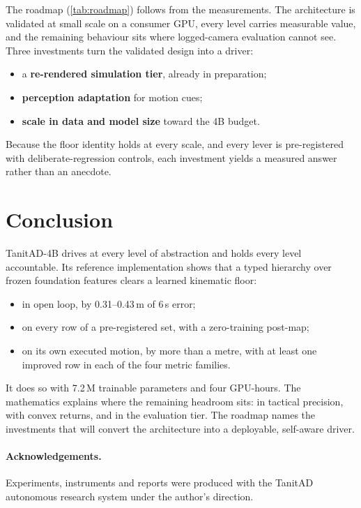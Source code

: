 \documentclass[10pt,twocolumn]{article}
\theoremstyle{remark}
\begin{document}
The roadmap (\cref{tab:roadmap}) follows from the measurements. The architecture is validated at small scale on a consumer GPU,
every level carries measurable value, and the remaining behaviour sits where logged-camera evaluation cannot see. Three investments
turn the validated design into a driver:
\begin{itemize}
  \item a \textbf{re-rendered simulation tier}, already in preparation;
  \item \textbf{perception adaptation} for motion cues;
  \item \textbf{scale in data and model size} toward the 4B budget.
\end{itemize}
Because the floor identity holds at every scale, and every lever is pre-registered with deliberate-regression controls, each
investment yields a measured answer rather than an anecdote.

\section{Conclusion}
TanitAD-4B drives at every level of abstraction and holds every level accountable. Its reference implementation shows that a typed
hierarchy over frozen foundation features clears a learned kinematic floor:
\begin{itemize}
  \item in open loop, by 0.31--0.43\,m of 6\,s error;
  \item on every row of a pre-registered set, with a zero-training post-map;
  \item on its own executed motion, by more than a metre, with at least one improved row in each of the four metric families.
\end{itemize}
It does so with 7.2\,M trainable parameters and four GPU-hours. The mathematics explains where the remaining headroom sits: in
tactical precision, with convex returns, and in the evaluation tier. The roadmap names the investments that will convert the
architecture into a deployable, self-aware driver.

\paragraph{Acknowledgements.} Experiments, instruments and reports were produced with the TanitAD autonomous research system under
the author's direction.
\end{document}
